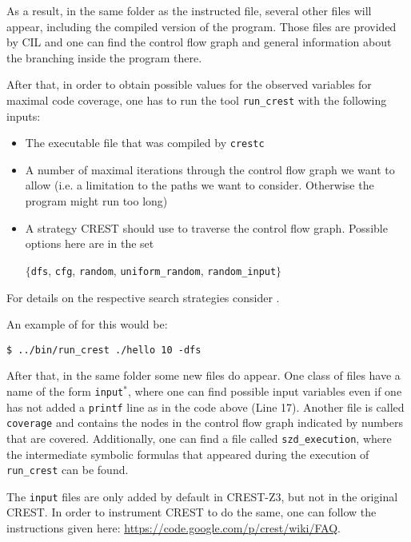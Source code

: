 \documentclass[oribibl]{llncs}
\begin{document}
As a result, in the same folder as the instructed file, several other
files will appear, including the compiled version of the
program. Those files are provided by \textsc{CIL} and one can find the
control flow graph and general information about the branching inside
the program there. %

After that, in order to obtain possible values for the observed
variables for maximal code coverage, one has to run the tool
\texttt{run\_crest} with the following inputs:
\begin{itemize}
  \item The executable file that was compiled by \texttt{crestc}
  \item A number of maximal iterations through the control flow graph
    we want to allow (i.e. a limitation to the paths we
    want to consider. Otherwise the program might run too long)
  \item A strategy \textsc{CREST} should use to traverse the control
    flow graph. Possible options here are in the set
\begin{center}
$\{$\texttt{dfs}, \texttt{cfg}, \texttt{random},
    \texttt{uniform\_random}, \texttt{random\_input}$\}$
\end{center}
\end{itemize}
For details on the respective search strategies consider
\cite{CREST}.

An example of for this would be:
\begin{verbatim}
$ ../bin/run_crest ./hello 10 -dfs
\end{verbatim}

After that, in the same folder some new files do appear. One class of
files have a name of the form \texttt{input}${}^*$, where one can find possible input
variables even if one has not added a \texttt{printf} line as in the
code above (Line 17). Another file is called \texttt{coverage} and contains the
nodes in the control flow graph indicated by numbers that are
covered. Additionally, one can find a file called
\texttt{szd\_execution}, where the intermediate symbolic formulas that
appeared during the execution of \texttt{run\_crest} can be found.

\begin{remark}
  The \texttt{input} files are only added by default in
  \textsc{CREST-Z3}, but not in the original \textsc{CREST}. In order
  to instrument \textsc{CREST} to do the same, one can follow the
  instructions given here: \url{https://code.google.com/p/crest/wiki/FAQ}.
\end{remark}
\end{document}
